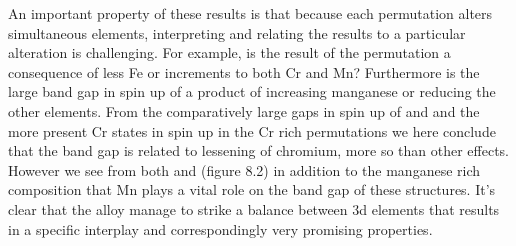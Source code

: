 An important property of these results is that because each permutation alters simultaneous elements, interpreting and relating the results to a particular alteration is challenging. For example, is the result of the  permutation a consequence of less Fe or increments to both Cr and Mn? Furthermore is the large band gap in spin up of  a product of increasing manganese or reducing the other elements. From the comparatively large gaps in spin up of  and  and the more present Cr states in spin up in the Cr rich permutations we here conclude that the band gap is related to lessening of chromium, more so than other effects. However we see from both  and  (figure 8.2) in addition to the manganese rich composition that Mn plays a vital role on the band gap of these structures. It's clear that the  alloy manage to strike a balance between 3d elements that results in a specific interplay and correspondingly very promising properties. 

